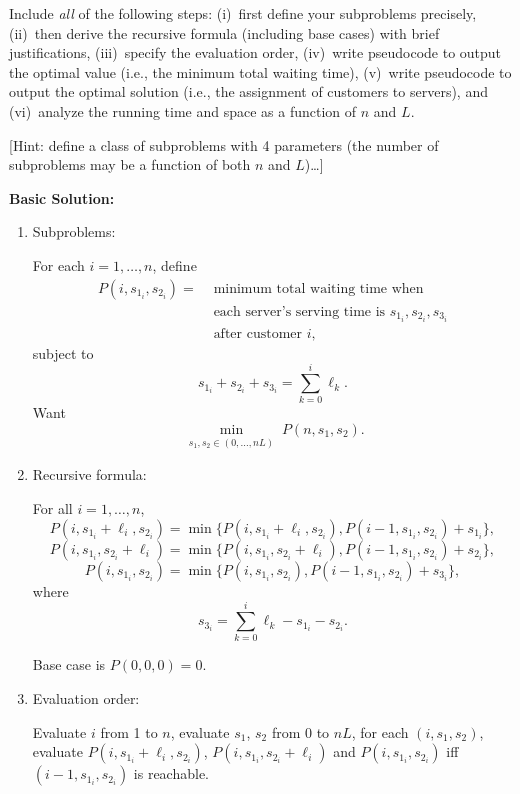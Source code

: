 \documentclass[11pt]{article}
\begin{document}
\begin{description}
Include \emph{all} of 
the following steps: (i)~first define your subproblems precisely, 
(ii)~then derive the recursive formula (including base cases) with brief justifications,
(iii)~specify the evaluation order,
(iv)~write pseudocode to output the optimal value (i.e., the minimum total waiting time),
(v)~write pseudocode to output the optimal solution (i.e., the assignment of customers to servers),  
and (vi)~analyze the running time and space as a function of $n$ and $L$.

[Hint: define a class of subproblems with 4
parameters (the number of subproblems may be a function of both $n$ and $L$)\ldots]


\textbf{Basic Solution:}
\begin{enumerate}
  \item[(i)] Subproblems:

  For each $i=1,\ldots,n$, define
  \begin{equation*}
  \begin{aligned}
    P(i, s_{1_i}, s_{2_i}) = & \text{ minimum total waiting time when } \\ 
    & \text{ each server's serving time is $s_{1_i}, s_{2_i}, s_{3_i}$} \\ 
    & \text{ after customer $i$},
  \end{aligned}
  \end{equation*}
  subject to
  \[
    s_{1_i} + s_{2_i} + s_{3_i} = \sum_{k=0}^{i}\ell_k.
  \]
  Want
  \[
    \min_{\substack{s_1, s_2 \in (0,\ldots,nL)}}P(n, s_1, s_2).
  \]

  \item[(ii)] Recursive formula:

  For all $i=1,\ldots,n$,
  \[
    P(i, s_{1_i} + \ell_i, s_{2_i}) = \min\{P(i, s_{1_i} + \ell_i, s_{2_i}), P(i-1, s_{1_i}, s_{2_i}) + s_{1_i}\},
  \]
  \[
    P(i, s_{1_i}, s_{2_i} + \ell_i) = \min\{P(i, s_{1_i}, s_{2_i} + \ell_i), P(i-1, s_{1_i}, s_{2_i}) + s_{2_i}\},
  \]
  \[
    P(i, s_{1_i}, s_{2_i}) = \min\{P(i, s_{1_i}, s_{2_i}), P(i-1, s_{1_i}, s_{2_i}) + s_{3_i}\},
  \]
  where
  \[
    s_{3_i} = \sum_{k=0}^{i}\ell_k - s_{1_i} - s_{2_i}.
  \]

  Base case is $P(0, 0, 0) = 0$.

  \item[(iii)] Evaluation order:
  
  Evaluate $i$ from 1 to $n$, evaluate $s_1$, $s_2$ from 0 to $nL$, 
  for each $(i, s_1, s_2)$, evaluate 
  $P(i, s_{1_i} + \ell_i, s_{2_i})$, 
  $P(i, s_{1_i}, s_{2_i} + \ell_i)$ and 
  $P(i, s_{1_i}, s_{2_i})$ iff
  $(i-1, s_{1_i}, s_{2_i})$ is reachable.


\end{enumerate}
\end{description}
\end{document}
